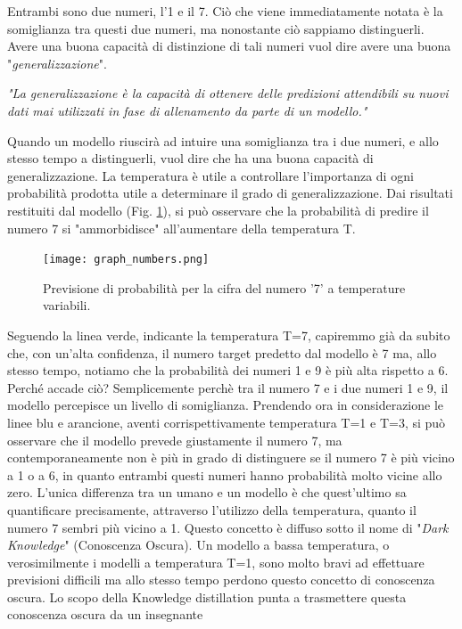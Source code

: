 Entrambi sono due numeri, l'1 
e il 7. Ciò che viene immediatamente notata è la somiglianza tra questi due 
numeri, ma nonostante ciò sappiamo distinguerli. Avere una buona capacità 
di distinzione di tali numeri vuol dire avere una buona "\emph{generalizzazione}". 
\begin{displayquote}
    \emph{"La generalizzazione è la capacità di ottenere delle predizioni 
    attendibili su nuovi dati mai utilizzati in fase di allenamento 
    da parte di un modello."}
\end{displayquote}
Quando un modello riuscirà ad intuire una somiglianza tra i due numeri, 
e allo stesso tempo a distinguerli, vuol dire che ha una buona capacità di 
generalizzazione. La temperatura è utile a controllare l'importanza di ogni 
probabilità prodotta utile a determinare il grado di generalizzazione. Dai 
risultati restituiti dal modello (Fig. \ref{7_1}), si può osservare che la probabilità 
di predire il numero 7 si "ammorbidisce" all'aumentare della temperatura T.
\begin{figure}
    \centering
    \texttt{[image: graph\_numbers.png]}
    \centering
    \caption{Previsione di probabilità per la cifra del numero '7' a temperature variabili.}
    \label{7_1}
\end{figure}
Seguendo la linea verde, indicante la temperatura T=7, capiremmo già da 
subito che, con un'alta confidenza, il numero target predetto dal modello è 7 
ma, allo stesso tempo, notiamo che la probabilità dei numeri 1 e 9 è più alta 
rispetto a 6. Perché accade ciò? Semplicemente perchè tra il numero 7 e i 
due numeri 1 e 9, il modello percepisce un livello di somiglianza. Prendendo 
ora in considerazione le linee blu e arancione, aventi corrispettivamente 
temperatura T=1 e T=3, si può osservare che il modello prevede giustamente 
il numero 7, ma contemporaneamente non è più in grado di distinguere se il 
numero 7 è più vicino a 1 o a 6, in quanto entrambi questi numeri hanno 
probabilità molto vicine allo zero. L'unica differenza tra un umano e un 
modello è che quest'ultimo sa quantificare precisamente, attraverso l'utilizzo 
della temperatura, quanto il numero 7 sembri più vicino a 1. Questo concetto 
è diffuso sotto il nome di "\emph{Dark Knowledge}" (Conoscenza Oscura). Un 
modello a bassa temperatura, o verosimilmente i modelli a temperatura 
T=1, sono molto bravi ad effettuare previsioni difficili ma allo stesso tempo 
perdono questo concetto di conoscenza oscura. Lo scopo della Knowledge 
distillation punta a trasmettere questa conoscenza oscura da un insegnante 

